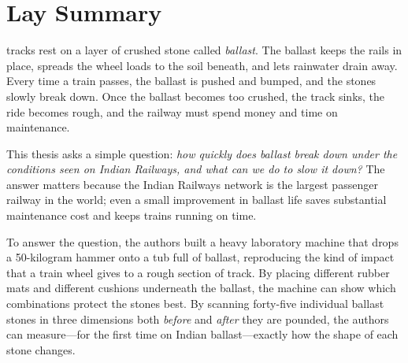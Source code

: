 %

\cleardoublepage
\chapter*{Lay Summary}
\thispagestyle{plain}

\begingroup
\setlength{\parindent}{0pt}

 tracks rest on a layer of crushed stone called
\emph{ballast}. The ballast keeps the rails in place, spreads the wheel
loads to the soil beneath, and lets rainwater drain away. Every time a
train passes, the ballast is pushed and bumped, and the stones slowly
break down. Once the ballast becomes too crushed, the track sinks, the
ride becomes rough, and the railway must spend money and time on
maintenance.

\bigskip

This thesis asks a simple question: \emph{how quickly does ballast break
down under the conditions seen on Indian Railways, and what can we do
to slow it down?} The answer matters because the Indian Railways
network is the largest passenger railway in the world; even a small
improvement in ballast life saves substantial maintenance cost and
keeps trains running on time.

\bigskip

To answer the question, the authors built a heavy laboratory machine
that drops a 50-kilogram hammer onto a tub full of ballast,
reproducing the kind of impact that a train wheel gives to a rough
section of track. By placing different rubber mats and different
cushions underneath the ballast, the machine can show which
combinations protect the stones best. By scanning forty-five
individual ballast stones in three dimensions both \emph{before} and
\emph{after} they are pounded, the authors can measure---for the
first time on Indian ballast---exactly how the shape of each stone
changes.

